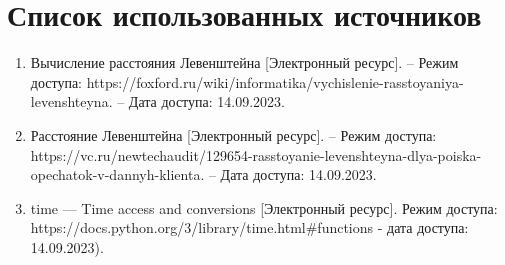 \chapter*{Список использованных источников}
\begin{enumerate}
	\item Вычисление расстояния Левенштейна [Электронный ресурс]. – Режим доступа: https://foxford.ru/wiki/informatika/vychislenie-rasstoyaniya-levenshteyna. – Дата доступа: 14.09.2023.
	\item Расстояние Левенштейна [Электронный ресурс]. – Режим доступа: https://vc.ru/newtechaudit/129654-rasstoyanie-levenshteyna-dlya-poiska-opechatok-v-dannyh-klienta. – Дата доступа: 14.09.2023.
	\item time — Time access and conversions [Электронный ресурс]. Режим доступа: https://docs.python.org/3/library/time.html\#functions - дата доступа: 14.09.2023).
\end{enumerate}
